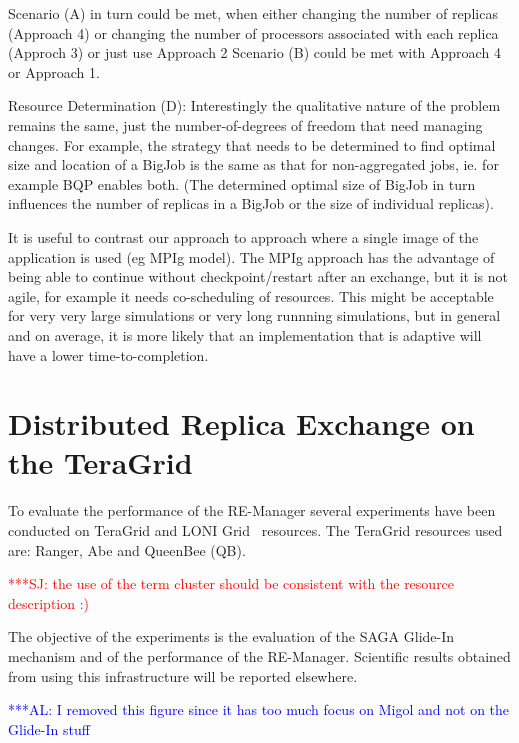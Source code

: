 \documentclass{rspublic}
\newcommand{\alnote}[1]{ {\textcolor{blue} { ***AL: #1 }}}
\newcommand{\jhanote}[1]{ {\textcolor{red} { ***SJ: #1 }}}
\newcommand{\alnote}[1]{}
\newcommand{\jhanote}[1]{}
\begin{document}
{Scenario (A) in turn could be met, when either changing the number of
replicas (Approach 4) or changing the number of processors associated
with each replica (Approch 3) or just use Approach 2 Scenario (B)
could be met with Approach 4 or Approach 1.

Resource Determination (D): Interestingly the qualitative nature of
the problem remains the same, just the number-of-degrees of freedom
that need managing changes. For example, the strategy that needs to be
determined to find optimal size and location of a BigJob is the same
as that for non-aggregated jobs, ie. for example BQP enables both.
(The determined optimal size of BigJob in turn influences the number
of replicas in a BigJob or the size of individual replicas).

It is useful to contrast our approach to approach where a single image
of the application is used (eg MPIg model). The MPIg approach has the
advantage of being able to continue without checkpoint/restart after
an exchange, but it is not agile, for example it needs co-scheduling
of resources. This might be acceptable for very very large simulations
or very long runnning simulations, but in general and on average, it
is more likely that an implementation that is adaptive will have a
lower time-to-completion.

\section{Distributed Replica Exchange on the TeraGrid}
\label{sec:exp}
        
To evaluate the performance of the RE-Manager several experiments have
been conducted on TeraGrid and LONI Grid~\citep{loni} resources. The
TeraGrid resources used are: Ranger, Abe and QueenBee (QB).

\jhanote{the use of the term cluster should be consistent with the
  resource description :)}


The objective of the experiments is the evaluation of the SAGA
Glide-In mechanism and of the performance of the
RE-Manager. Scientific results obtained from using this infrastructure
will be reported elsewhere.

\alnote{I removed this figure since it has too much focus on Migol and not
on the Glide-In stuff}

}
\end{document}
